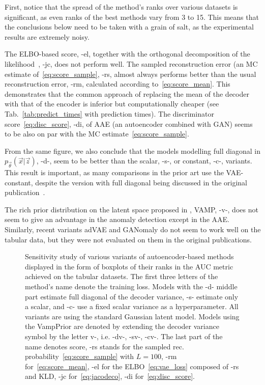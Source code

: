 First, notice that the spread of the method's ranks over various datasets is significant, as even ranks of the best methods vary from 3 to 15. This means that the conclusions below need to be taken with a grain of salt, as the experimental results are extremely noisy.

The ELBO-based score,  -el, together with the orthogonal decomposition of the likelihood~\cite{pidhorskyi2018generative}, -jc, does not perform well. The sampled reconstruction error (an MC estimate of~\eqref{eq:score_sample}, \mbox{-rs}, almost always performs better than the usual reconstruction error, -rm, calculated according to~\eqref{eq:score_mean}. This demonstrates that the common approach of replacing the mean of the decoder with that of the encoder is inferior but computationally cheaper (see Tab.~\ref{tab:predict_times} with prediction times). The discriminator score~\eqref{eq:disc_score}, -di, of AAE (an autoencoder combined with GAN) seems to be also on par with the MC estimate~\eqref{eq:score_sample}. 

From the same figure, we also conclude that the models modelling full diagonal in $p_{\vec{\theta}}(\vec{x}|\vec{z})$, -d-, seem to be better than the scalar, -s-, or constant, -c-, variants. This result is important, as many comparisons in the prior art use the VAE-constant, despite the version with full diagonal being discussed in the original publication~\cite{kingma2013auto}.

The rich prior distribution on the latent space proposed in \cite{tomczak2018vae}, VAMP, -v-, does not seem to give an advantage in the anomaly detection except in the AAE. Similarly, recent variants adVAE and GANomaly do not seem to work well on the tabular data, but they were not evaluated on them in the original publications.

\begin{figure}
    \centering
    \small
    
    \caption{Sensitivity study of various variants of  autoencoder-based methods displayed in the form of boxplots of their ranks in the AUC metric achieved on the tabular datasets. The first three letters of the method's name denote the training loss. Models with the -d- middle part estimate full diagonal of the decoder variance, -s- estimate only a scalar, and -c-  use a fixed scalar variance as a hyperparameter. All variants are using the standard Gaussian latent model. Models using the VampPrior are denoted by extending the decoder variance symbol by the letter v-, i.e. -dv-, -sv-, -cv-. The last part of the name denotes score, -rs stands for the sampled rec. probability~\eqref{eq:score_sample} with $L=100$, -rm for~\eqref{eq:score_mean}, -el for the ELBO~\eqref{eq:vae_loss} composed of -rs and KLD, -jc for~\eqref{eq:jacodeco}, -di for~\eqref{eq:disc_score}.}
    \label{fig:tabular_ae_only_box_auc_meanmax}
\end{figure}


